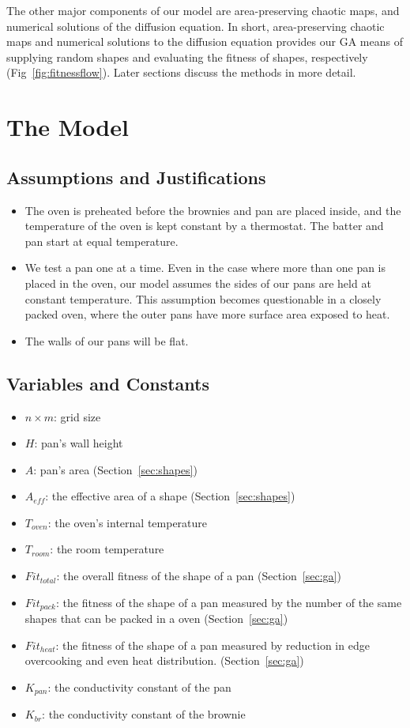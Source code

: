 \documentclass[12pt]{reedmcm}
\begin{document}
The other major components of our model are area-preserving chaotic maps, and numerical solutions of the diffusion equation.
In short, area-preserving chaotic maps and numerical solutions to the diffusion equation provides our GA means of supplying random shapes and evaluating the fitness of shapes, respectively (Fig~\ref{fig:fitnessflow}).
Later sections discuss the methods in more detail.

\section{The Model}
\subsection{Assumptions and Justifications}
\begin{itemize}
  \item The oven is preheated before the brownies and pan are placed inside, and the temperature of the oven is kept constant by a thermostat. The batter and pan start at equal temperature.

  \item We test a pan one at a time. 
  Even in the case where more than one pan is placed in the oven, our model assumes the sides of our pans are held at constant temperature.  This assumption becomes questionable in a closely packed oven, where the outer pans have more surface area exposed to heat.

  \item The walls of our pans will be flat.
\end{itemize}

\subsection{Variables and Constants}
\begin{itemize}
  \item $n\times m$: grid size
  \item $H$: pan's wall height
  \item $A$: pan's area (Section~\ref{sec:shapes})
  \item $A_{eff}$: the effective area of a shape (Section~\ref{sec:shapes})
  \item $T_{oven}$: the oven's internal temperature
  \item $T_{room}$: the room temperature
  \item $Fit_{total}$: the overall fitness of the shape of a pan (Section~\ref{sec:ga})
  \item $Fit_{pack}$: the fitness of the shape of a pan measured by the number of the same shapes that can be packed in a oven (Section~\ref{sec:ga})
  \item $Fit_{heat}$: the fitness of the shape of a pan measured by reduction in edge overcooking and even heat distribution. (Section~\ref{sec:ga})
  \item $K_{pan}$: the conductivity constant of the pan
  \item $K_{br}$: the conductivity constant of the brownie
\end{itemize}
\end{document}
